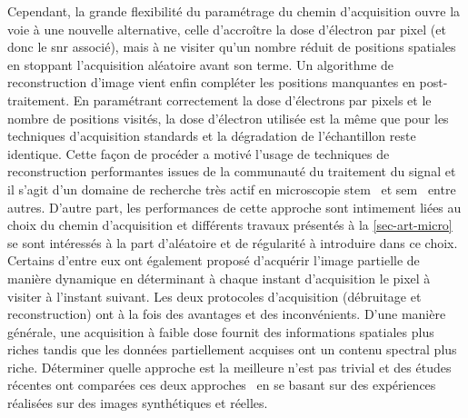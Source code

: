     Cependant, la grande flexibilité du paramétrage du chemin d'acquisition ouvre la voie à une nouvelle alternative, celle d'accroître la dose d'électron par pixel (et donc le \gls{snr} associé), mais à ne visiter qu'un nombre réduit de positions spatiales en stoppant l'acquisition aléatoire avant son terme. Un algorithme de reconstruction d'image vient enfin compléter les positions manquantes en post-traitement. En paramétrant correctement la dose d'électrons par pixels et le nombre de positions visités, la dose d'électron utilisée est la même que pour les techniques d'acquisition standards et la dégradation de l'échantillon reste identique. 
    Cette façon de procéder a motivé l'usage de techniques de reconstruction performantes issues de la communauté du traitement du signal et il s'agit d'un domaine de recherche très actif en microscopie \gls{stem}~\cite{beche2016compressed,stevens2014potential} et \gls{sem}~\cite{anderson2013sparse} entre autres.
    D'autre part, les performances de cette approche sont intimement liées au choix du chemin d'acquisition et différents travaux présentés à la \cref{sec-art-micro} se sont intéressés à la part d'aléatoire et de régularité à introduire dans ce choix. Certains d'entre eux ont également proposé d'acquérir l'image partielle de manière dynamique en déterminant à chaque instant d'acquisition le pixel à visiter à l'instant suivant.
    Les deux protocoles d'acquisition (débruitage et reconstruction) ont à la fois des avantages et des inconvénients. D'une manière générale, une acquisition à faible dose fournit des informations spatiales plus riches tandis que les données partiellement acquises ont un contenu spectral plus riche. Déterminer quelle approche est la meilleure n'est pas trivial et des études récentes ont comparées ces deux approches~\cite{trampert2018ultramicroscopy} en se basant sur des expériences réalisées sur des images synthétiques et réelles.
    
